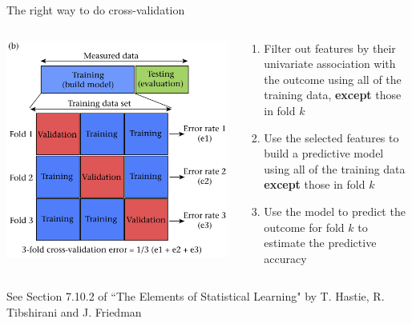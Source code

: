 \documentclass[pdf]{beamer}
\begin{document}
\begin{frame}{The right way to do cross-validation}

\begin{columns}

\begin{column}{0.4\textwidth}
	\begin{center}
   \includegraphics[width=.9\textwidth]{crossvalidation.png}
   \end{center}
\end{column}

\begin{column}{0.6\textwidth}
	\begin{enumerate}\addtolength{\itemsep}{1\baselineskip}
		\item Filter out features by their univariate association with the outcome using all of the training data, \textbf{except} those in fold $k$
		\item Use the selected features to build a predictive model using all of the training data \textbf{except} those in fold $k$ 
		\item Use the model to predict the outcome for fold $k$ to estimate the predictive accuracy
	\end{enumerate}
\end{column}

\end{columns}
\vfill
{\tiny See Section 7.10.2 of ``The Elements of Statistical Learning" by T. Hastie, R. Tibshirani and J. Friedman}
\end{frame}
\end{document}
